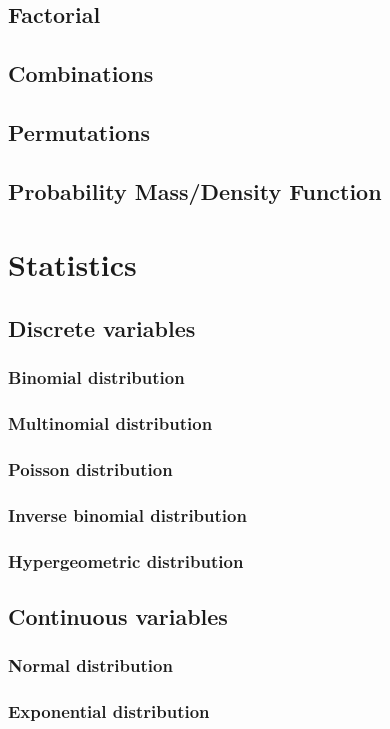 \documentclass{report}
\begin{document}
	\section{Factorial}
	\section{Combinations}
	\section{Permutations}
	\section{Probability Mass/Density Function}

\chapter{Statistics}
	\section{Discrete variables}
		\subsection{Binomial distribution}
		\subsection{Multinomial distribution}
		\subsection{Poisson distribution}
		\subsection{Inverse binomial distribution}
		\subsection{Hypergeometric distribution}
	\section{Continuous variables}
		\subsection{Normal distribution}
		\subsection{Exponential distribution}
\end{document}

